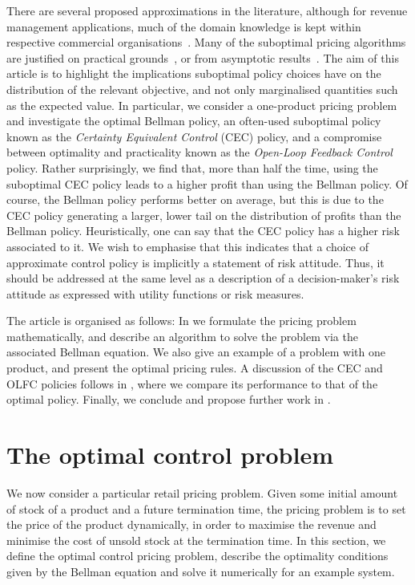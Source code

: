 \documentclass{rsproca_new}
\theoremstyle{definition}
\begin{document}
There are several proposed approximations in the
literature, although for revenue management applications, much of the domain knowledge is kept within
respective commercial organisations~\cite[Ch.~9]{talluri2006theory}.
Many of the suboptimal pricing algorithms are justified on practical
grounds~\cite{aviv2012dynamic}, or
from asymptotic results~\cite{gallego1994optimal}.
The aim of this article is to highlight the implications suboptimal policy
choices have on the distribution of the relevant objective, and not
only marginalised quantities such as the expected value.
In particular, we consider a one-product pricing problem and
investigate the optimal Bellman policy, an often-used suboptimal
policy known as the \emph{Certainty Equivalent Control} (CEC)
policy, and a compromise between optimality and practicality known as the
\emph{Open-Loop Feedback Control} policy.
Rather surprisingly, we find that, more than half the
time, using the suboptimal CEC policy
leads to a higher profit than using the Bellman policy. Of course, the
Bellman policy performs better on average, but
this is due to the CEC policy generating a larger, lower tail on the
distribution of profits than the Bellman policy.
Heuristically, one can say that the CEC policy has a higher risk
associated to it. We wish to emphasise that this indicates that a
choice of approximate control policy is implicitly a statement of
risk attitude. Thus, it should be addressed at the same level as a
description of a decision-maker's risk attitude as expressed with
utility functions or risk measures.

The article is organised as follows:
In  we formulate the
pricing problem mathematically, and describe an algorithm to solve the
problem via the associated Bellman equation. We also give an example
of a problem with one product, and present the optimal pricing rules.
A discussion of the CEC and OLFC policies follows in
, where we compare its
performance to that of
the optimal policy.
Finally, we conclude and propose further work in .


\section{The optimal control problem}\label{sec:bellman_optimal_control}
We now consider a particular retail
pricing problem.
Given some initial amount of stock of a product and a future
termination time,
the pricing problem is to
set the price
of the product dynamically, in order to maximise the revenue and minimise the cost of
unsold stock at the termination time.
In this section, we define the optimal control pricing problem,
describe the optimality conditions given by the Bellman equation and
solve it numerically for an example system.
\end{document}

